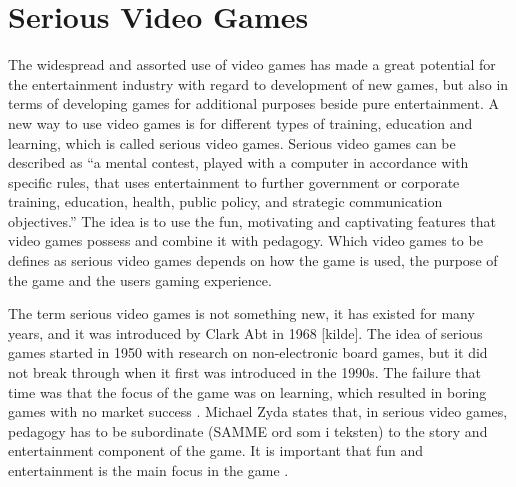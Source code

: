 \section{Serious Video Games}
The widespread and assorted use of video games has made a great potential for the entertainment industry with regard to development of new games, but also in terms of developing games for additional purposes beside pure entertainment. A new way to use video games is for different types of training, education and learning, which is called serious video games. Serious video games can be described as “a mental contest, played with a computer in accordance with specific rules, that uses entertainment to further government or corporate training, education, health, public policy, and strategic communication objectives.” \cite{zyda2005visual} The idea is to use the fun, motivating and captivating features that video games possess and combine it with pedagogy. Which video games to be defines as serious video games depends on how the game is used, the purpose of the game and the users gaming experience. 


The term serious video games is not something new, it has existed for many years, and it was introduced by Clark Abt in 1968 [kilde]. The idea of serious games started in 1950 with research on non-electronic board games,  but it did not break through when it first was introduced in the 1990s. The failure that time was that the focus of the game was on learning, which resulted in boring games with no market success \cite{susi2007serious}. Michael Zyda states that, in serious video games, pedagogy has to be subordinate (SAMME ord som i teksten) to the story and entertainment component of the game. It is important that fun and entertainment is the main focus in the game \cite{zyda2005visual}. 


